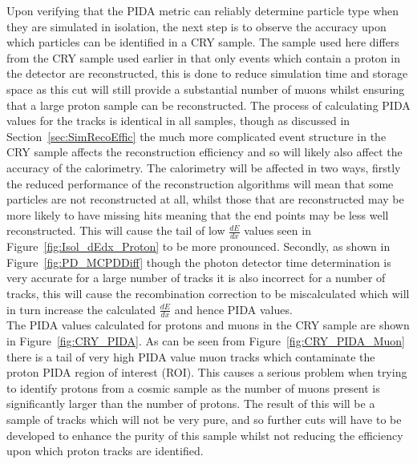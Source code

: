 Upon verifying that the PIDA metric can reliably determine particle type when they are simulated in isolation, the next step is to observe the accuracy upon which particles can be identified in a CRY sample. The sample used here differs from the CRY sample used earlier in that only events which contain a proton in the detector are reconstructed, this is done to reduce simulation time and storage space as this cut will still provide a substantial number of muons whilst ensuring that a large proton sample can be reconstructed. The process of calculating PIDA values for the tracks is identical in all samples, though as discussed in Section~\ref{sec:SimRecoEffic} the much more complicated event structure in the CRY sample affects the reconstruction efficiency and so will likely also affect the accuracy of the calorimetry. The calorimetry will be affected in two ways, firstly the reduced performance of the reconstruction algorithms will mean that some particles are not reconstructed at all, whilst those that are reconstructed may be more likely to have missing hits meaning that the end points may be less well reconstructed. This will cause the tail of low $\frac{dE}{dx}$ values seen in Figure~\ref{fig:Isol_dEdx_Proton} to be more pronounced. Secondly, as shown in Figure~\ref{fig:PD_MCPDDiff} though the photon detector time determination is very accurate for a large number of tracks it is also incorrect for a number of tracks, this will cause the recombination correction to be miscalculated which will in turn increase the calculated $\frac{dE}{dx}$ and hence PIDA values. \\

The PIDA values calculated for protons and muons in the CRY sample are shown in Figure~\ref{fig:CRY_PIDA}. As can be seen from Figure~\ref{fig:CRY_PIDA_Muon} there is a tail of very high PIDA value muon tracks which contaminate the proton PIDA region of interest (ROI). This causes a serious problem when trying to identify protons from a cosmic sample as the number of muons present is significantly larger than the number of protons. The result of this will be a sample of tracks which will not be very pure, and so further cuts will have to be developed to enhance the purity of this sample whilst not reducing the efficiency upon which proton tracks are identified. \\

